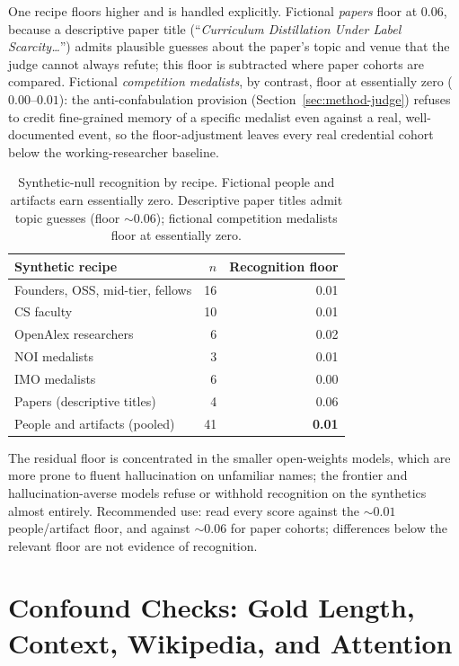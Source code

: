 One recipe floors higher and is handled explicitly. Fictional \emph{papers} floor at $0.06$, because a descriptive paper title (``\emph{Curriculum Distillation Under Label Scarcity\ldots}'') admits plausible guesses about the paper's topic and venue that the judge cannot always refute; this floor is subtracted where paper cohorts are compared. Fictional \emph{competition medalists}, by contrast, floor at essentially zero ($0.00$--$0.01$): the anti-confabulation provision (Section~\ref{sec:method-judge}) refuses to credit fine-grained memory of a specific medalist even against a real, well-documented event, so the floor-adjustment leaves every real credential cohort below the working-researcher baseline.

\begin{table}[!htbp]
\centering
\small
\caption{Synthetic-null recognition by recipe. Fictional people and artifacts earn essentially zero. Descriptive paper titles admit topic guesses (floor $\sim 0.06$); fictional competition medalists floor at essentially zero.}
\label{tab:synthetic}
\begin{tabular}{lrr}
\toprule
Synthetic recipe & $n$ & Recognition floor \\
\midrule
Founders, OSS, mid-tier, fellows & 16 & 0.01 \\
CS faculty & 10 & 0.01 \\
OpenAlex researchers & 6 & 0.02 \\
NOI medalists & 3 & 0.01 \\
IMO medalists & 6 & 0.00 \\
Papers (descriptive titles) & 4 & 0.06 \\
\midrule
People and artifacts (pooled) & 41 & \textbf{0.01} \\
\bottomrule
\end{tabular}
\end{table}

The residual floor is concentrated in the smaller open-weights models, which are more prone to fluent hallucination on unfamiliar names; the frontier and hallucination-averse models refuse or withhold recognition on the synthetics almost entirely. Recommended use: read every score against the $\sim 0.01$ people/artifact floor, and against $\sim 0.06$ for paper cohorts; differences below the relevant floor are not evidence of recognition.

\section{Confound Checks: Gold Length, Context, Wikipedia, and Attention}
\label{app:confounds}

